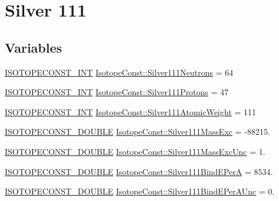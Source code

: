 \hypertarget{group___isotope_const-_silver-_ag111}{}\section{Silver 111}
\label{group___isotope_const-_silver-_ag111}
\subsection*{Variables}
\begin{DoxyCompactItemize}
\item 
\mbox{\hyperlink{group___isotope_const-_macros_ga5f18360b3e99483a35c32d789e62621c}{I\+S\+O\+T\+O\+P\+E\+C\+O\+N\+S\+T\+\_\+\+I\+NT}} \mbox{\hyperlink{group___isotope_const-_silver-_ag111_ga3e1555ded273ad9ccfd82b26226aeb9e}{Isotope\+Const\+::\+Silver111\+Neutrons}} = 64
\item 
\mbox{\hyperlink{group___isotope_const-_macros_ga5f18360b3e99483a35c32d789e62621c}{I\+S\+O\+T\+O\+P\+E\+C\+O\+N\+S\+T\+\_\+\+I\+NT}} \mbox{\hyperlink{group___isotope_const-_silver-_ag111_gaccb4cc0b94ff7ee57fde7dfc91ad0fd5}{Isotope\+Const\+::\+Silver111\+Protons}} = 47
\item 
\mbox{\hyperlink{group___isotope_const-_macros_ga5f18360b3e99483a35c32d789e62621c}{I\+S\+O\+T\+O\+P\+E\+C\+O\+N\+S\+T\+\_\+\+I\+NT}} \mbox{\hyperlink{group___isotope_const-_silver-_ag111_ga689af1971da0e1836d56942f9e17af3f}{Isotope\+Const\+::\+Silver111\+Atomic\+Weight}} = 111
\item 
\mbox{\hyperlink{group___isotope_const-_macros_ga8f45a7272ce02c0b4c65c44636ed719a}{I\+S\+O\+T\+O\+P\+E\+C\+O\+N\+S\+T\+\_\+\+D\+O\+U\+B\+LE}} \mbox{\hyperlink{group___isotope_const-_silver-_ag111_gad14cb0e83af11b8caf9381607f592eaf}{Isotope\+Const\+::\+Silver111\+Mass\+Exc}} = -\/88215.
\item 
\mbox{\hyperlink{group___isotope_const-_macros_ga8f45a7272ce02c0b4c65c44636ed719a}{I\+S\+O\+T\+O\+P\+E\+C\+O\+N\+S\+T\+\_\+\+D\+O\+U\+B\+LE}} \mbox{\hyperlink{group___isotope_const-_silver-_ag111_ga6275f9bd3c519444be84fba68d48c185}{Isotope\+Const\+::\+Silver111\+Mass\+Exc\+Unc}} = 1.
\item 
\mbox{\hyperlink{group___isotope_const-_macros_ga8f45a7272ce02c0b4c65c44636ed719a}{I\+S\+O\+T\+O\+P\+E\+C\+O\+N\+S\+T\+\_\+\+D\+O\+U\+B\+LE}} \mbox{\hyperlink{group___isotope_const-_silver-_ag111_ga2f665e29102d372da3249355908535ac}{Isotope\+Const\+::\+Silver111\+Bind\+E\+PerA}} = 8534.
\item 
\mbox{\hyperlink{group___isotope_const-_macros_ga8f45a7272ce02c0b4c65c44636ed719a}{I\+S\+O\+T\+O\+P\+E\+C\+O\+N\+S\+T\+\_\+\+D\+O\+U\+B\+LE}} \mbox{\hyperlink{group___isotope_const-_silver-_ag111_gadc800e6b8685f9da8c2d34f1d2601fef}{Isotope\+Const\+::\+Silver111\+Bind\+E\+Per\+A\+Unc}} = 0.

\end{DoxyCompactItemize}
